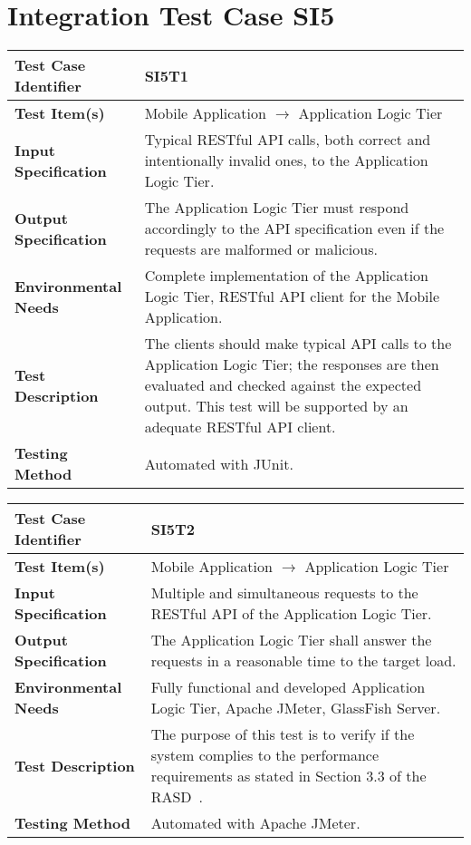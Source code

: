\newpage
\section{Integration Test Case SI5}

\begin{longtable}{p{} | p{}}
\hline
\textbf{Test Case Identifier} & SI5T1\\
\hline
\textbf{Test Item(s)} & Mobile Application $\rightarrow$ Application Logic Tier \\
\hline
\textbf{Input Specification} & Typical RESTful API calls, both correct and intentionally invalid ones, to the Application Logic Tier. \\
\hline
\textbf{Output Specification} & The Application Logic Tier must respond accordingly to the API specification even if the requests are malformed or malicious. \\
\hline
\textbf{Environmental Needs} & Complete implementation of the Application Logic Tier, RESTful API client for the Mobile Application. \\
\hline
\textbf{Test Description} & The clients should make typical API calls to the Application Logic Tier; the responses are then evaluated and checked against the expected output. This test will be supported by an adequate RESTful API client. \\
\hline
\textbf{Testing Method} & Automated with JUnit. \\
\hline
\end{longtable}

\begin{longtable}{p{} | p{}}
\hline
\textbf{Test Case Identifier} & SI5T2\\
\hline
\textbf{Test Item(s)} & Mobile Application $\rightarrow$ Application Logic Tier \\
\hline
\textbf{Input Specification} & Multiple and simultaneous requests to the RESTful API of the Application Logic Tier. \\
\hline
\textbf{Output Specification} & The Application Logic Tier shall answer the requests in a reasonable time to the target load. \\
\hline
\textbf{Environmental Needs} & Fully functional and developed Application Logic Tier, Apache JMeter, GlassFish Server. \\
\hline
\textbf{Test Description} & The purpose of this test is to verify if the system complies to the performance requirements as stated in Section 3.3 of the RASD~\cite{rasd}. \\
\hline
\textbf{Testing Method} & Automated with Apache JMeter. \\
\hline
\end{longtable}

